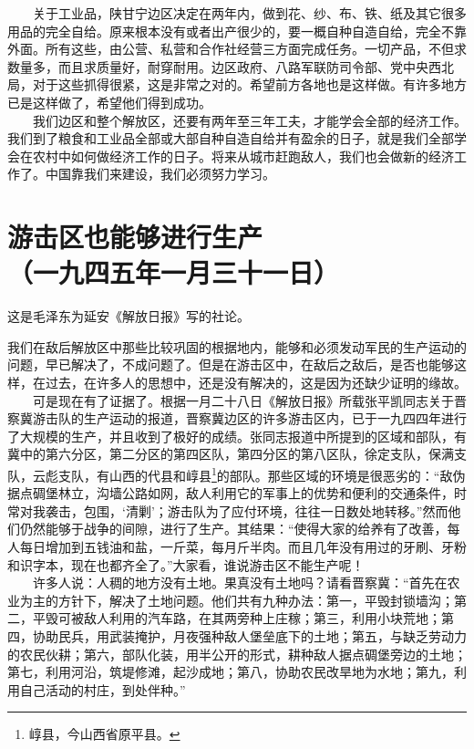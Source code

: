 \documentclass[cn,11pt,chinese]{elegantbook}
\def\myformat#1{\hfil\hfil #1}
\begin{document}
　　关于工业品，陕甘宁边区决定在两年内，做到花、纱、布、铁、纸及其它很多用品的完全自给。原来根本没有或者出产很少的，要一概自种自造自给，完全不靠外面。所有这些，由公营、私营和合作社经营三方面完成任务。一切产品，不但求数量多，而且求质量好，耐穿耐用。边区政府、八路军联防司令部、党中央西北局，对于这些抓得很紧，这是非常之对的。希望前方各地也是这样做。有许多地方已是这样做了，希望他们得到成功。\\
　　我们边区和整个解放区，还要有两年至三年工夫，才能学会全部的经济工作。我们到了粮食和工业品全部或大部自种自造自给并有盈余的日子，就是我们全部学会在农村中如何做经济工作的日子。将来从城市赶跑敌人，我们也会做新的经济工作了。中国靠我们来建设，我们必须努力学习。\\
\newpage\section*{\myformat{游击区也能够进行生产}\\\myformat{（一九四五年一月三十一日）}}
\begin{introduction}\item  这是毛泽东为延安《解放日报》写的社论。\end{introduction}
我们在敌后解放区中那些比较巩固的根据地内，能够和必须发动军民的生产运动的问题，早已解决了，不成问题了。但是在游击区中，在敌后之敌后，是否也能够这样，在过去，在许多人的思想中，还是没有解决的，这是因为还缺少证明的缘故。\\
　　可是现在有了证据了。根据一月二十八日《解放日报》所载张平凯同志关于晋察冀游击队的生产运动的报道，晋察冀边区的许多游击区内，已于一九四四年进行了大规模的生产，并且收到了极好的成绩。张同志报道中所提到的区域和部队，有冀中的第六分区，第二分区的第四区队，第四分区的第八区队，徐定支队，保满支队，云彪支队，有山西的代县和崞县\footnote[1]{ 崞县，今山西省原平县。}的部队。那些区域的环境是很恶劣的：“敌伪据点碉堡林立，沟墙公路如网，敌人利用它的军事上的优势和便利的交通条件，时常对我袭击，包围，‘清剿’；游击队为了应付环境，往往一日数处地转移。”然而他们仍然能够于战争的间隙，进行了生产。其结果：“使得大家的给养有了改善，每人每日增加到五钱油和盐，一斤菜，每月斤半肉。而且几年没有用过的牙刷、牙粉和识字本，现在也都齐全了。”大家看，谁说游击区不能生产呢！\\
　　许多人说：人稠的地方没有土地。果真没有土地吗？请看晋察冀：“首先在农业为主的方针下，解决了土地问题。他们共有九种办法：第一，平毁封锁墙沟；第二，平毁可被敌人利用的汽车路，在其两旁种上庄稼；第三，利用小块荒地；第四，协助民兵，用武装掩护，月夜强种敌人堡垒底下的土地；第五，与缺乏劳动力的农民伙耕；第六，部队化装，用半公开的形式，耕种敌人据点碉堡旁边的土地；第七，利用河沿，筑堤修滩，起沙成地；第八，协助农民改旱地为水地；第九，利用自己活动的村庄，到处伴种。”\\
\end{document}
